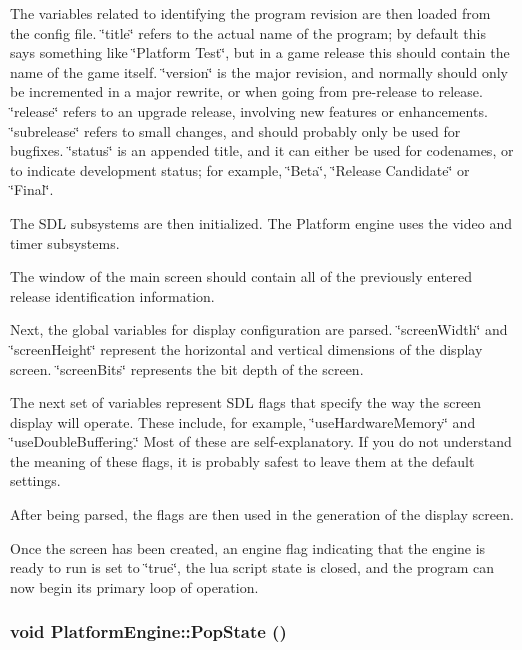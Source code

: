 The variables related to identifying the program revision are then loaded from the config file. \char`\"{}title\char`\"{} refers to the actual name of the program; by default this says something like \char`\"{}Platform Test\char`\"{}, but in a game release this should contain the name of the game itself. \char`\"{}version\char`\"{} is the major revision, and normally should only be incremented in a major rewrite, or when going from pre-release to release. \char`\"{}release\char`\"{} refers to an upgrade release, involving new features or enhancements. \char`\"{}subrelease\char`\"{} refers to small changes, and should probably only be used for bugfixes. \char`\"{}status\char`\"{} is an appended title, and it can either be used for codenames, or to indicate development status; for example, \char`\"{}Beta\char`\"{}, \char`\"{}Release Candidate\char`\"{} or \char`\"{}Final\char`\"{}.

The SDL subsystems are then initialized. The Platform engine uses the video and timer subsystems.

The window of the main screen should contain all of the previously entered release identification information.

Next, the global variables for display configuration are parsed. \char`\"{}screenWidth\char`\"{} and \char`\"{}screenHeight\char`\"{} represent the horizontal and vertical dimensions of the display screen. \char`\"{}screenBits\char`\"{} represents the bit depth of the screen.

The next set of variables represent SDL flags that specify the way the screen display will operate. These include, for example, \char`\"{}useHardwareMemory\char`\"{} and \char`\"{}useDoubleBuffering.\char`\"{} Most of these are self-explanatory. If you do not understand the meaning of these flags, it is probably safest to leave them at the default settings.

After being parsed, the flags are then used in the generation of the display screen.

Once the screen has been created, an engine flag indicating that the engine is ready to run is set to \char`\"{}true\char`\"{}, the lua script state is closed, and the program can now begin its primary loop of operation.\hypertarget{class_platform_engine_cf001abec596906465197d1220db2230}{
\subsubsection[{PopState}]{\setlength{\rightskip}{0pt plus 5cm}void PlatformEngine::PopState ()}}
\label{class_platform_engine_cf001abec596906465197d1220db2230}


